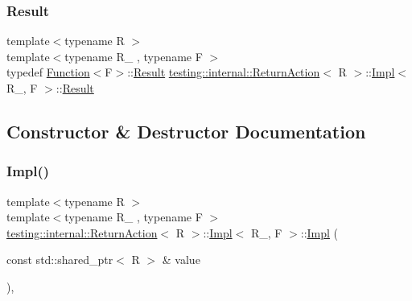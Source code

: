 \subsubsection{\texorpdfstring{Result}{Result}\hspace{0.1cm}{\footnotesize\ttfamily [3/3]}}
{\footnotesize\ttfamily template$<$typename R $>$ \\
template$<$typename R\+\_\+ , typename F $>$ \\
typedef \mbox{\hyperlink{structtesting_1_1internal_1_1_function}{Function}}$<$F$>$\+::\mbox{\hyperlink{classtesting_1_1_action_interface_a7477de2fe3e4e01c59db698203acaee7}{Result}} \mbox{\hyperlink{classtesting_1_1internal_1_1_return_action}{testing\+::internal\+::\+Return\+Action}}$<$ R $>$\+::\mbox{\hyperlink{classtesting_1_1internal_1_1_return_action_1_1_impl}{Impl}}$<$ R\+\_\+, F $>$\+::\mbox{\hyperlink{classtesting_1_1_action_interface_a7477de2fe3e4e01c59db698203acaee7}{Result}}}



\subsection{Constructor \& Destructor Documentation}
\mbox{\label{classtesting_1_1internal_1_1_return_action_1_1_impl_adacdef502a597ee9f92b52f21153cab9}} 
\subsubsection{\texorpdfstring{Impl()}{Impl()}\hspace{0.1cm}{\footnotesize\ttfamily [1/3]}}
{\footnotesize\ttfamily template$<$typename R $>$ \\
template$<$typename R\+\_\+ , typename F $>$ \\
\mbox{\hyperlink{classtesting_1_1internal_1_1_return_action}{testing\+::internal\+::\+Return\+Action}}$<$ R $>$\+::\mbox{\hyperlink{classtesting_1_1internal_1_1_return_action_1_1_impl}{Impl}}$<$ R\+\_\+, F $>$\+::\mbox{\hyperlink{classtesting_1_1internal_1_1_return_action_1_1_impl}{Impl}} (\begin{DoxyParamCaption}\item[{const std\+::shared\+\_\+ptr$<$ R $>$ \&}]{value }\end{DoxyParamCaption})\hspace{0.3cm}{\ttfamily [inline]}, {\ttfamily [explicit]}}


